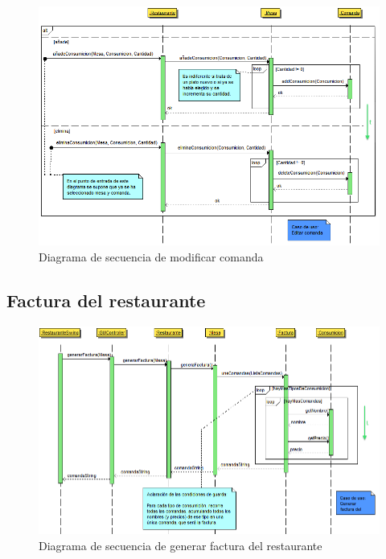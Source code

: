\documentclass[spanish,a4paper,11pt, twoside]{report}	%
\begin{document}
		\begin{figure}[!h]
		\centering
		\includegraphics[scale=0.5]{DSmodificarcomanda.png}
		\caption{Diagrama de secuencia de modificar comanda}
		\end{figure}



		\subsection{Factura del restaurante}
		\begin{figure}[!h]
		\centering
		\includegraphics[scale=0.5]{DSfactura.png}
		\caption{Diagrama de secuencia de generar factura del restaurante}
		\end{figure}
\end{document}

